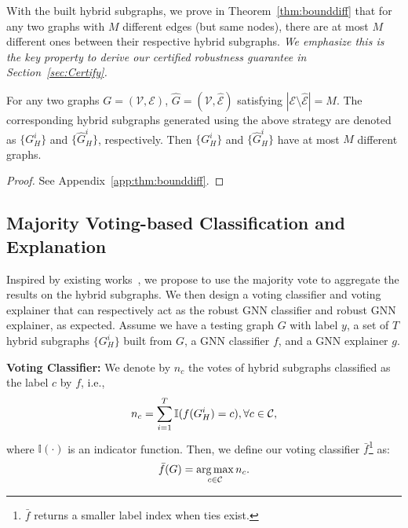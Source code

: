 With the built hybrid subgraphs, we prove in Theorem~\ref{thm:bounddiff} that for any two graphs with $M$ different edges (but same nodes), there are at most $M$ different ones between their respective hybrid subgraphs. 
\emph{We emphasize this is the key property to derive our certified robustness guarantee in Section~\ref{sec:Certify}.}   

\begin{theorem}
\label{thm:bounddiff}
For any two graphs $G=(\mathcal{V},\mathcal{E})$, $\hat{G}=(\mathcal{V}, \hat{\mathcal{E}})$ satisfying $|\mathcal{E}\setminus \hat{\mathcal{E}}| = M$. 
The corresponding hybrid subgraphs generated using the above strategy are denoted as  $\{ G_H^i\}$ and $\{ \hat{G}_H^i\}$, respectively. 
Then $\{ G_H^i\}$ and $\{ \hat{G}_H^i\}$ have at most $M$ different graphs. 
\vspace{-2mm}
\end{theorem}
\begin{proof}
See Appendix~\ref{app:thm:bounddiff}.
\end{proof}


\subsection{Majority Voting-based Classification and Explanation}
\label{sec:Voting}

Inspired by existing works~\citep{levine2020randomized,jia2022certified,xia2024gnncert,yang2024distributed}, we propose to use the majority vote to aggregate the results on the hybrid subgraphs. 
We then design a voting classifier and voting explainer that can respectively act as the robust GNN classifier and robust GNN explainer, as expected. 
Assume we have a testing graph $G$ with label $y$, a set of $T$ hybrid subgraphs $\{G_H^{i}\}$ built from $G$, a GNN classifier $f$, and a GNN explainer $g$.  

{\bf Voting Classifier:} 
We denote by $n_c$ the votes of hybrid subgraphs classified as the label $c$ by $f$, i.e., 
{\begin{align}
\small
\label{eqn:labelcount}
n_c = \sum_{i=1}^{T}\mathbb{I}(f(G_H^{i})=c), \forall c \in \mathcal{C},
\end{align}}
where $\mathbb{I}(\cdot)$ is an indicator function.  Then, we define 
our voting classifier $\bar{f}$\footnote{$\bar{f}$ returns a smaller label index when ties exist.} as: 
\begin{align}
\bar{f}(G) = \underset{c \in \mathcal{C}}{{\arg\max}} \, n_c.
\vspace{-2mm}
\end{align}


